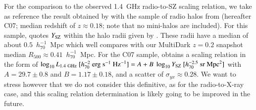 \documentclass[traditabstract]{aa}
\newcommand{\rmn}{\mathrm}
\begin{document}
For the comparison to the observed 1.4~GHz radio-to-SZ scaling relation, we take as reference the result obtained by \cite{2012MNRAS.421L.112B} with the sample of radio halos from \cite{2007MNRAS.378.1565C} (hereafter C07; median redshift of $z \approx 0.18$; note that no mini-halos are included). For this sample, \cite{2012MNRAS.421L.112B} quotes $Y_{\rm{SZ}}$ within the halo radii given by \cite{2007MNRAS.378.1565C}. These radii have a median of about $0.5$~$h_{70}^{-1}$~Mpc which well compares with our MultiDark $z = 0.2$ snapshot median $R_{500} \approx 0.41$~$h_{70}^{-1}$~Mpc. For the C07 sample, \cite{2012MNRAS.421L.112B} obtains a scaling relation in the form of  $\log_{10} L_{1.4~\rmn{GHz}}~[h_{70}^{-2}~\rmn{erg}~\rmn{s}^{-1}~\rmn{Hz}^{-1}] = A + B~\log_{10} Y_{\rm{SZ}}~[h_{70}^{-2.5}~\rmn{sr}~\rmn{Mpc}^{2}]$ with $A=29.7\pm0.8$ and $B=1.17\pm0.18$, and a scatter of $\sigma_{yx} \approx 0.28$. We want to stress however that we do not consider this definitive, as for the radio-to-X-ray case, and this scaling relation determination is likely going to be improved in the future. 
\end{document}
